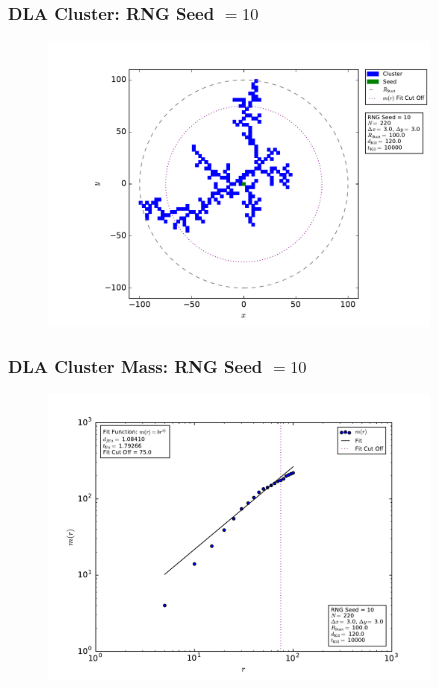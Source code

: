 \documentclass[mathserif,18pt,xcolor=table]{beamer}
\begin{document}
\begin{frame}
  \frametitle{DLA Cluster: RNG Seed $= 10$}
\begin{figure}
  \centering
  \includegraphics[width=0.9\textwidth]{problem_3/large_cluster_seed_num_10.pdf}
\end{figure}
\end{frame}

\begin{frame}
  \frametitle{DLA Cluster Mass: RNG Seed $= 10$}
\begin{figure}
  \centering
  \includegraphics[width=0.9\textwidth]{problem_3/large_cluster_mass_seed_num_10.pdf}
\end{figure}
\end{frame}
\end{document}
